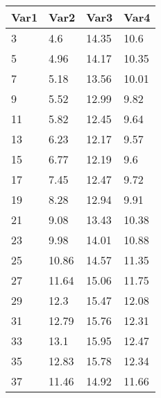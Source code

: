 \begin{tabular}{llll}
Var1 & Var2 & Var3 & Var4 \\ 
\hline 
3 & 4.6 & 14.35 & 10.6 \\ 
5 & 4.96 & 14.17 & 10.35 \\ 
7 & 5.18 & 13.56 & 10.01 \\ 
9 & 5.52 & 12.99 & 9.82 \\ 
11 & 5.82 & 12.45 & 9.64 \\ 
13 & 6.23 & 12.17 & 9.57 \\ 
15 & 6.77 & 12.19 & 9.6 \\ 
17 & 7.45 & 12.47 & 9.72 \\ 
19 & 8.28 & 12.94 & 9.91 \\ 
21 & 9.08 & 13.43 & 10.38 \\ 
23 & 9.98 & 14.01 & 10.88 \\ 
25 & 10.86 & 14.57 & 11.35 \\ 
27 & 11.64 & 15.06 & 11.75 \\ 
29 & 12.3 & 15.47 & 12.08 \\ 
31 & 12.79 & 15.76 & 12.31 \\ 
33 & 13.1 & 15.95 & 12.47 \\ 
35 & 12.83 & 15.78 & 12.34 \\ 
37 & 11.46 & 14.92 & 11.66 \\ 
\hline 
\end{tabular}